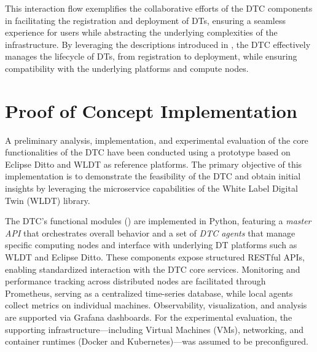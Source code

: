 This interaction flow exemplifies the collaborative efforts of the DTC components in facilitating the registration and deployment of DTs, ensuring a seamless experience for users while abstracting the underlying complexities of the infrastructure.
%
By leveraging the descriptions introduced in , the DTC effectively manages the lifecycle of DTs, from registration to deployment, while ensuring compatibility with the underlying platforms and compute nodes.

\section{Proof of Concept Implementation}


A preliminary analysis, implementation, and experimental evaluation of the core functionalities of the DTC have been conducted using a prototype based on Eclipse Ditto and WLDT as reference platforms.
%
The primary objective of this implementation is to demonstrate the feasibility of the DTC and obtain initial insights by leveraging the microservice capabilities of the White Label Digital Twin (WLDT) library.

The DTC's functional modules () are implemented in Python, featuring a \emph{master API} that orchestrates overall behavior and a set of \emph{DTC agents} that manage specific computing nodes and interface with underlying DT platforms such as WLDT and Eclipse Ditto. 
%
These components expose structured RESTful APIs, enabling standardized interaction with the DTC core services. Monitoring and performance tracking across distributed nodes are facilitated through Prometheus, serving as a centralized time-series database, while local agents collect metrics on individual machines.
%
Observability, visualization, and analysis are supported via Grafana dashboards. For the experimental evaluation, the supporting infrastructure—including Virtual Machines (VMs), networking, and container runtimes (Docker and Kubernetes)—was assumed to be preconfigured.


